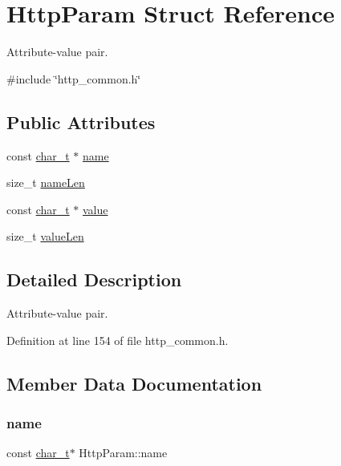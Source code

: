 \hypertarget{structHttpParam}{}\section{Http\+Param Struct Reference}
\label{structHttpParam}


Attribute-\/value pair.  




{\ttfamily \#include \char`\"{}http\+\_\+common.\+h\char`\"{}}

\subsection*{Public Attributes}
\begin{DoxyCompactItemize}
\item 
const \hyperlink{compiler__port_8h_a40bb5262bf908c328fbcfbe5d29d0201}{char\+\_\+t} $\ast$ \hyperlink{structHttpParam_a859a58fcd616267b812156aec22a747d}{name}
\item 
size\+\_\+t \hyperlink{structHttpParam_add2e147b2d6049958bce49266ea47aa0}{name\+Len}
\item 
const \hyperlink{compiler__port_8h_a40bb5262bf908c328fbcfbe5d29d0201}{char\+\_\+t} $\ast$ \hyperlink{structHttpParam_a5474d862a96866927a3a6880731e9af6}{value}
\item 
size\+\_\+t \hyperlink{structHttpParam_abfd3afa2a5a13c642897c3ed8848db48}{value\+Len}
\end{DoxyCompactItemize}


\subsection{Detailed Description}
Attribute-\/value pair. 

Definition at line 154 of file http\+\_\+common.\+h.



\subsection{Member Data Documentation}
\mbox{\label{structHttpParam_a859a58fcd616267b812156aec22a747d}} 
\subsubsection{\texorpdfstring{name}{name}}
{\footnotesize\ttfamily const \hyperlink{compiler__port_8h_a40bb5262bf908c328fbcfbe5d29d0201}{char\+\_\+t}$\ast$ Http\+Param\+::name}



